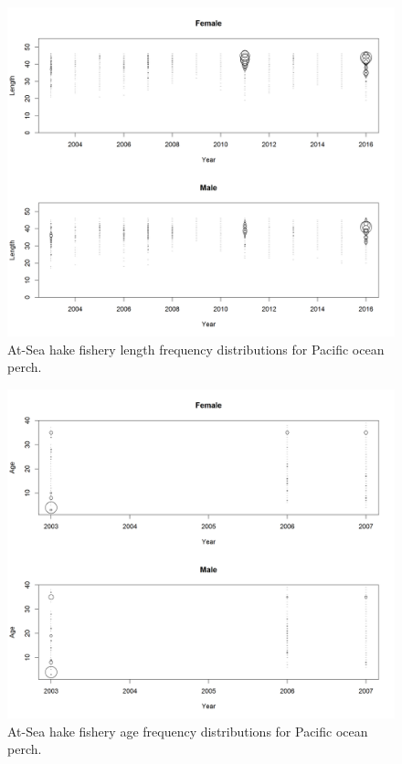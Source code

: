 \documentclass[12pt,]{article}
\begin{document}
\FloatBarrier

\begin{figure}
\centering
\includegraphics{Figures/ASHOP_lengths.png}
\caption{At-Sea hake fishery length frequency distributions for Pacific
ocean perch. \label{fig:ASHOP_Length}}
\end{figure}

\FloatBarrier

\begin{figure}
\centering
\includegraphics{Figures/ASHOP_ages.png}
\caption{At-Sea hake fishery age frequency distributions for Pacific
ocean perch. \label{fig:ASHOP_Age}}
\end{figure}
\end{document}
